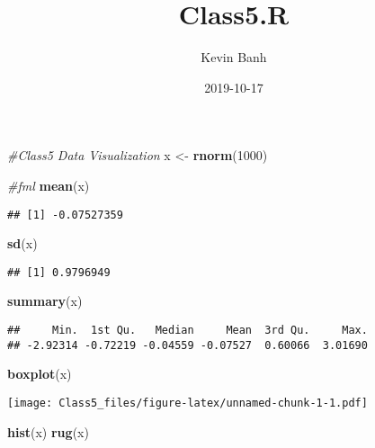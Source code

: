 \documentclass[]{article}
\title{Class5.R}
\author{Kevin Banh}
\date{2019-10-17}
\newenvironment{Shaded}{\begin{snugshade}}{\end{snugshade}}
\newcommand{\CommentTok}[1]{\textcolor[rgb]{0.56,0.35,0.01}{\textit{#1}}}
\newcommand{\DecValTok}[1]{\textcolor[rgb]{0.00,0.00,0.81}{#1}}
\newcommand{\KeywordTok}[1]{\textcolor[rgb]{0.13,0.29,0.53}{\textbf{#1}}}
\newcommand{\NormalTok}[1]{#1}
\newcommand{\StringTok}[1]{\textcolor[rgb]{0.31,0.60,0.02}{#1}}
\begin{document}
\maketitle

\begin{Shaded}
\begin{Highlighting}[]
\CommentTok{#Class5 Data Visualization }
\NormalTok{x <-}\StringTok{ }\KeywordTok{rnorm}\NormalTok{(}\DecValTok{1000}\NormalTok{)}

\CommentTok{#fml}
\KeywordTok{mean}\NormalTok{(x)}
\end{Highlighting}
\end{Shaded}

\begin{verbatim}
## [1] -0.07527359
\end{verbatim}

\begin{Shaded}
\begin{Highlighting}[]
\KeywordTok{sd}\NormalTok{(x)}
\end{Highlighting}
\end{Shaded}

\begin{verbatim}
## [1] 0.9796949
\end{verbatim}

\begin{Shaded}
\begin{Highlighting}[]
\KeywordTok{summary}\NormalTok{(x)}
\end{Highlighting}
\end{Shaded}

\begin{verbatim}
##     Min.  1st Qu.   Median     Mean  3rd Qu.     Max. 
## -2.92314 -0.72219 -0.04559 -0.07527  0.60066  3.01690
\end{verbatim}

\begin{Shaded}
\begin{Highlighting}[]
\KeywordTok{boxplot}\NormalTok{(x)}
\end{Highlighting}
\end{Shaded}

\texttt{[image: Class5\_files/figure-latex/unnamed-chunk-1-1.pdf]}

\begin{Shaded}
\begin{Highlighting}[]
\KeywordTok{hist}\NormalTok{(x)}
\KeywordTok{rug}\NormalTok{(x)}
\end{Highlighting}
\end{Shaded}
\end{document}
